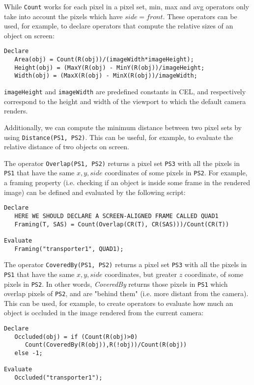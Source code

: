 While \texttt{Count} works for each pixel in a pixel set, min, max and avg operators only take into account the pixels which have $side=front$.
These operators can be used, for example, to declare operators that compute the relative sizes of an object on screen:

\begin{verbatim}
Declare
   Area(obj) = Count(R(obj))/(imageWidth*imageHeight);
   Height(obj) = (MaxY(R(obj) - MinY(R(obj))/imageHeight;
   Width(obj) = (MaxX(R(obj) - MinX(R(obj))/imageWidth;
\end{verbatim}

\texttt{imageHeight} and \texttt{imageWidth} are predefined constants in CEL, and respectively correspond to the height and width of the viewport to which the default camera renders.

Additionally, we can compute the minimum distance between two pixel sets by using \texttt{Distance(PS1, PS2)}. This can be useful, for example, to evaluate the relative distance of two objects on screen.

The operator \texttt{Overlap(PS1, PS2)} returns a pixel set \texttt{PS3} with all the pixels in \texttt{PS1} that have the same $x, y, side$ coordinates of some pixels in \texttt{PS2}. For example, a framing property (i.e. checking if an object is inside some frame in the rendered image) can be defined and evaluated by the following script:

\begin{verbatim}
Declare
   HERE WE SHOULD DECLARE A SCREEN-ALIGNED FRAME CALLED QUAD1
   Framing(T, SAS) = Count(Overlap(CR(T), CR(SAS)))/Count(CR(T))

Evaluate
   Framing("transporter1", QUAD1);
\end{verbatim}

The operator \texttt{CoveredBy(PS1, PS2)} returns a pixel set \texttt{PS3} with all the pixels in \texttt{PS1} that have the same $x, y, side$ coordinates, but greater $z$ coordinate, of some pixels in \texttt{PS2}. In other words, \emph{CoveredBy} returns those pixels in \texttt{PS1} which overlap pixels of \texttt{PS2}, and are "behind them" (i.e. more distant from the camera). This can be used, for example, to create operators to evaluate how much an object is occluded in the image rendered from the current camera:

\begin{verbatim}
Declare
   Occluded(obj) = if (Count(R(obj)>0) 
      Count(CoveredBy(R(obj)),R(!obj))/Count(R(obj))
   else -1;

Evaluate
   Occluded("transporter1");
\end{verbatim}

